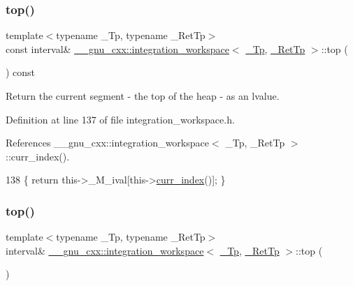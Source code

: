 \subsubsection{\texorpdfstring{top()}{top()}\hspace{0.1cm}{\footnotesize\ttfamily [1/2]}}
{\footnotesize\ttfamily template$<$typename \+\_\+\+Tp, typename \+\_\+\+Ret\+Tp$>$ \\
const interval\& \hyperlink{class____gnu__cxx_1_1integration__workspace}{\+\_\+\+\_\+gnu\+\_\+cxx\+::integration\+\_\+workspace}$<$ \hyperlink{namespace____gnu__cxx_a3b19a9c800ca194374ef9172290f7d79}{\+\_\+\+Tp}, \hyperlink{namespace____gnu__cxx_a886e03ece3d53ff7fa6c098a40f93fa5}{\+\_\+\+Ret\+Tp} $>$\+::top (\begin{DoxyParamCaption}{ }\end{DoxyParamCaption}) const\hspace{0.3cm}{\ttfamily [inline]}}

Return the current segment -\/ the top of the heap -\/ as an lvalue. 

Definition at line 137 of file integration\+\_\+workspace.\+h.



References \+\_\+\+\_\+gnu\+\_\+cxx\+::integration\+\_\+workspace$<$ \+\_\+\+Tp, \+\_\+\+Ret\+Tp $>$\+::curr\+\_\+index().


\begin{DoxyCode}
138       \{ \textcolor{keywordflow}{return} this->\_M\_ival[this->\hyperlink{class____gnu__cxx_1_1integration__workspace_a51a384b1777615943add69f1895454f5}{curr\_index}()]; \}
\end{DoxyCode}
\mbox{\label{class____gnu__cxx_1_1integration__workspace_adc576b6ed1386c0b1c5eeae6040abf96}} 
\subsubsection{\texorpdfstring{top()}{top()}\hspace{0.1cm}{\footnotesize\ttfamily [2/2]}}
{\footnotesize\ttfamily template$<$typename \+\_\+\+Tp, typename \+\_\+\+Ret\+Tp$>$ \\
interval\& \hyperlink{class____gnu__cxx_1_1integration__workspace}{\+\_\+\+\_\+gnu\+\_\+cxx\+::integration\+\_\+workspace}$<$ \hyperlink{namespace____gnu__cxx_a3b19a9c800ca194374ef9172290f7d79}{\+\_\+\+Tp}, \hyperlink{namespace____gnu__cxx_a886e03ece3d53ff7fa6c098a40f93fa5}{\+\_\+\+Ret\+Tp} $>$\+::top (\begin{DoxyParamCaption}{ }\end{DoxyParamCaption})\hspace{0.3cm}{\ttfamily [inline]}}

